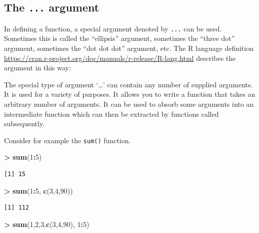 \documentclass[]{krantz}
\makeatletter
\newenvironment{Shaded}{\begin{snugshade}}{\end{snugshade}}
\newcommand{\KeywordTok}[1]{\textcolor[rgb]{0.27,0.27,0.27}{\textbf{#1}}}
\newcommand{\DecValTok}[1]{\textcolor[rgb]{0.06,0.06,0.06}{#1}}
\newcommand{\StringTok}[1]{\textcolor[rgb]{0.5,0.5,0.5}{#1}}
\newcommand{\OperatorTok}[1]{\textcolor[rgb]{0.43,0.43,0.43}{\textbf{#1}}}
\newcommand{\NormalTok}[1]{#1}
\renewenvironment{quote}{\begin{VF}}{\end{VF}}
\newenvironment{kframe}{%
\medskip{}
\setlength{\fboxsep}{.8em}
 \def\at@end@of@kframe{}%
 \ifinner\ifhmode%
  \def\at@end@of@kframe{\end{minipage}}%
  \begin{minipage}{\columnwidth}%
 \fi\fi%
 \def\FrameCommand##1{\hskip\@totalleftmargin \hskip-\fboxsep
 \colorbox{shadecolor}{##1}\hskip-\fboxsep
     \hskip-\linewidth \hskip-\@totalleftmargin \hskip\columnwidth}%
 \MakeFramed {\advance\hsize-\width
   \@totalleftmargin\z@ \linewidth\hsize
   \@setminipage}}%
 {\par\unskip\endMakeFramed%
 \at@end@of@kframe}
\renewenvironment{Shaded}{\begin{kframe}}{\end{kframe}}
\makeatother
\begin{document}
\subsection{\texorpdfstring{The \texttt{...}
argument}{The ... argument}}\label{the-...-argument}

In defining a function, a special argument denoted by \texttt{...} can
be used. Sometimes this is called the ``ellipsis'' argument, sometimes
the ``three dot'' argument, sometimes the ``dot dot dot'' argument, etc.
The R language definition
\url{https://cran.r-project.org/doc/manuals/r-release/R-lang.html}
describes the argument in this way:

\begin{quote}
The special type of argument `\ldots{}' can contain any number of
supplied arguments. It is used for a variety of purposes. It allows you
to write a function that takes an arbitrary number of arguments. It can
be used to absorb some arguments into an intermediate function which can
then be extracted by functions called subsequently.
\end{quote}

Consider for example the \texttt{sum()} function.

\begin{Shaded}
\begin{Highlighting}[]
\OperatorTok{>}\StringTok{ }\KeywordTok{sum}\NormalTok{(}\DecValTok{1}\OperatorTok{:}\DecValTok{5}\NormalTok{)}
\end{Highlighting}
\end{Shaded}

\begin{verbatim}
[1] 15
\end{verbatim}

\begin{Shaded}
\begin{Highlighting}[]
\OperatorTok{>}\StringTok{ }\KeywordTok{sum}\NormalTok{(}\DecValTok{1}\OperatorTok{:}\DecValTok{5}\NormalTok{, }\KeywordTok{c}\NormalTok{(}\DecValTok{3}\NormalTok{,}\DecValTok{4}\NormalTok{,}\DecValTok{90}\NormalTok{))}
\end{Highlighting}
\end{Shaded}

\begin{verbatim}
[1] 112
\end{verbatim}

\begin{Shaded}
\begin{Highlighting}[]
\OperatorTok{>}\StringTok{ }\KeywordTok{sum}\NormalTok{(}\DecValTok{1}\NormalTok{,}\DecValTok{2}\NormalTok{,}\DecValTok{3}\NormalTok{,}\KeywordTok{c}\NormalTok{(}\DecValTok{3}\NormalTok{,}\DecValTok{4}\NormalTok{,}\DecValTok{90}\NormalTok{), }\DecValTok{1}\OperatorTok{:}\DecValTok{5}\NormalTok{)}
\end{Highlighting}
\end{Shaded}
\end{document}
